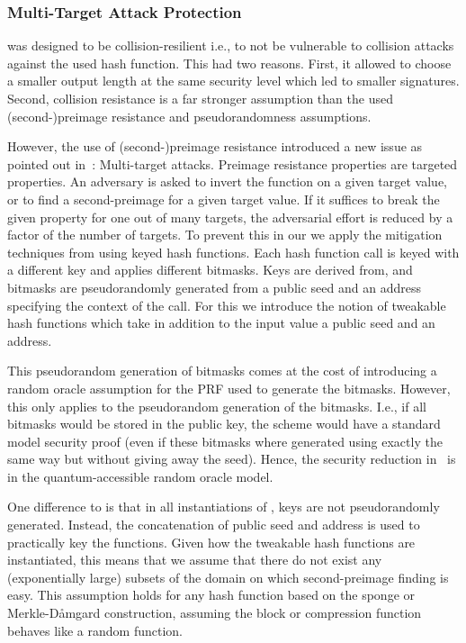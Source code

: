 \subsubsection{Multi-Target Attack Protection}
\spc was designed to be collision-resilient i.e., to not be vulnerable to
collision attacks against the used hash function. This had two reasons. First,
it allowed to choose a smaller output length at the same security level which
led to smaller signatures. Second, collision resistance is a far stronger
assumption than the used (second-)preimage resistance and pseudorandomness
assumptions.

However, the use of (second-)preimage resistance introduced a new issue as
pointed out in~\cite{Huelsing2016}: Multi-target attacks. Preimage resistance
properties are targeted properties. An adversary is asked to invert the function
on a given target value, or to find a second-preimage for a given target value.
If it suffices to break the given property for one out of many targets, the
adversarial effort is reduced by a factor of the number of targets. To prevent
this in our we apply the mitigation techniques from \cite{Huelsing2016} using keyed
hash functions. Each hash function call is keyed with a different key and applies
different bitmasks. Keys are derived from, and bitmasks are
pseudorandomly generated from a public seed and an address specifying the
context of the call. For this we introduce the notion of tweakable hash functions
which take in addition to the input value a public seed and an address.

This pseudorandom generation of bitmasks comes at the cost of introducing a
random oracle assumption for the PRF used to generate the bitmasks. However,
this only applies to the pseudorandom generation of the bitmasks. I.e., if
all bitmasks would be stored in the public key, the scheme would have a standard
model security proof (even if these bitmasks where generated using exactly the
same way but without giving away the seed). Hence, the security reduction
in~\cite{Huelsing2016} is in the quantum-accessible random oracle model.

One difference to \cite{Huelsing2016} is that in all instantiations of \spx,
keys are not pseudorandomly generated. Instead, the concatenation of
public seed and address is used to practically key the functions.
Given how the tweakable hash functions are instantiated, this means that we
assume that there do not exist any (exponentially large) subsets of the domain
on which second-preimage finding is easy. This assumption holds for any hash
function based on the sponge or Merkle-D{\aa}mgard construction, assuming the
block or compression function behaves like a random function.

